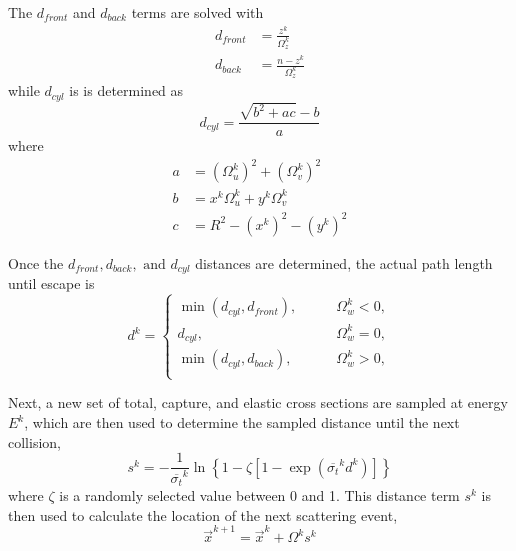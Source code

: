 The $d_{front}$ and $d_{back}$ terms are solved with
\begin{align}
    d_{front} &= \frac{z^k}{\Omega_{z}^{k}} \\
    d_{back} &= \frac{n - z^{k}}{\Omega^{k}_{z}}
\end{align}
while $d_{cyl}$ is is determined as
\begin{equation}
    \label{eq:cyl-intersection-distance}
    d_{cyl} = \frac{\sqrt{b^2 + ac} - b}{a}
\end{equation}
where
\begin{align}
    a &= \left( \Omega_{u}^{k} \right)^2 + \left( \Omega_{v}^{k} \right)^2\\
    b &= x^k \Omega_{u}^{k} + y^k\Omega_{v}^{k} \\
    c &= R^2 - \left( x^k \right)^2 - \left( y^k \right)^2
\end{align}

Once the $d_{front}, d_{back}, \text{ and } d_{cyl}$ distances are determined, the actual path length until escape is
\begin{equation}
    d^k =
    \begin{cases}
        \min{ \left( d_{cyl}, d_{front} \right)},   \qquad &\Omega_{w}^k < 0,\\
        d_{cyl},                                    \qquad &\Omega_{w}^k = 0, \\
        \min{ \left( d_{cyl}, d_{back} \right)},    \qquad &\Omega_{w}^k > 0,\\
    \end{cases}
\end{equation}

Next, a new set of total, capture, and elastic cross sections are sampled at energy $E^k$, which are then used to determine the sampled distance until the next collision,
\begin{equation}
    \label{eq:free-path-sampling}
    s^k = -\frac{1}{\overline{\sigma_{t} }^{k} }  \ln{\left\{
                1 - \zeta \left[ 1 - \exp{\left( \overline{\sigma_{t}}^{k} d^k \right)} \right]
    \right\}}
\end{equation}
where $\zeta$ is a randomly selected value between 0 and 1. This distance term $s^{k}$ is then used to calculate the location of the next scattering event,
\begin{equation}
    \label{eq:sampling-new-location}
    \overrightarrow{x}^{k+1} = \overrightarrow{x}^{k} + \Omega^{k}s^{k}
\end{equation}

